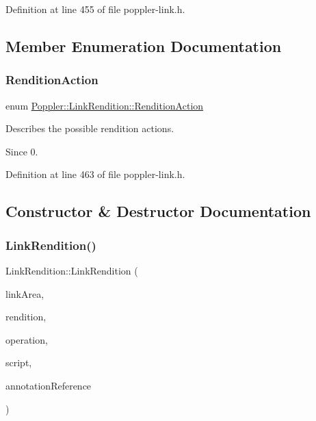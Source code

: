 Definition at line 455 of file poppler-\/link.\+h.



\subsection{Member Enumeration Documentation}
\mbox{\label{class_poppler_1_1_link_rendition_aede1a6b7156fe8973bdbeda39173704d}} 
\subsubsection{\texorpdfstring{Rendition\+Action}{RenditionAction}}
{\footnotesize\ttfamily enum \hyperlink{class_poppler_1_1_link_rendition_aede1a6b7156fe8973bdbeda39173704d}{Poppler\+::\+Link\+Rendition\+::\+Rendition\+Action}}

Describes the possible rendition actions.

\begin{DoxySince}{Since}
0. 
\end{DoxySince}


Definition at line 463 of file poppler-\/link.\+h.



\subsection{Constructor \& Destructor Documentation}
\mbox{\label{class_poppler_1_1_link_rendition_a0bdeadebca128c8abc8b15e27bbc6e80}} 
\subsubsection{\texorpdfstring{Link\+Rendition()}{LinkRendition()}}
{\footnotesize\ttfamily Link\+Rendition\+::\+Link\+Rendition (\begin{DoxyParamCaption}\item[{const Q\+RectF \&}]{link\+Area,  }\item[{\+::\hyperlink{class_poppler_1_1_media_rendition}{Media\+Rendition} $\ast$}]{rendition,  }\item[{int}]{operation,  }\item[{const Q\+String \&}]{script,  }\item[{const \hyperlink{struct_ref}{Ref} \&}]{annotation\+Reference }\end{DoxyParamCaption})}

